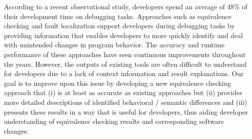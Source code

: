 According to a recent observational study, developers spend an average of 48\% of their development time on debugging tasks.
%
Approaches such as equivalence checking and fault localization support developers during debugging tasks by providing information that enables developers to more quickly identify and deal with unintended changes in program behavior.
%
The accuracy and runtime performance of these approaches have seen continuous improvements throughout the years.
%
However, the outputs of existing tools are often difficult to understand for developers due to a lack of context information and result explanations.
%
Our goal is to improve upon this issue by developing a new equivalence checking approach that (i) is at least as accurate as existing approaches but (ii) provides more detailed descriptions of identified behavioral / semantic differences and (iii) presents these results in a way that is useful for developers, thus aiding developer understanding of equivalence checking results and corresponding software changes.
